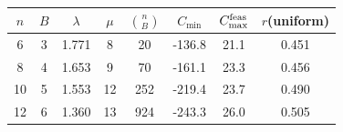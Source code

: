 \begin{tabular}{cccccccc}
$n$ & $B$ & $\lambda$ & $\mu$ & $\binom{n}{B}$ & $C_{\min}$ & $C_{\max}^{\rm feas}$
 & $r$(uniform) \\
\hline
6 & 3 & 1.771 & 8 & 20 & -136.8 & 21.1 & 0.451 \\
8 & 4 & 1.653 & 9 & 70 & -161.1 & 23.3 & 0.456 \\
10 & 5 & 1.553 & 12 & 252 & -219.4 & 23.7 & 0.490 \\
12 & 6 & 1.360 & 13 & 924 & -243.3 & 26.0 & 0.505 \\
\end{tabular}